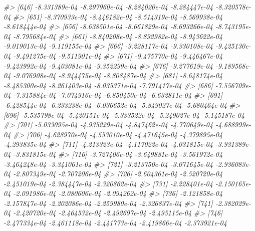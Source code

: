 \documentclass[
]{article}
\newenvironment{Shaded}{\begin{snugshade}}{\end{snugshade}}
\newcommand{\CommentTok}[1]{\textcolor[rgb]{0.56,0.35,0.01}{\textit{#1}}}
\begin{document}
\begin{Shaded}
\begin{Highlighting}[]
\CommentTok{\#\textgreater{} [646] {-}8.331389e{-}04 {-}8.297960e{-}04 {-}8.284020e{-}04 {-}8.284447e{-}04 {-}8.320578e{-}04}
\CommentTok{\#\textgreater{} [651] {-}8.370933e{-}04 {-}8.446182e{-}04 {-}8.514319e{-}04 {-}8.569938e{-}04 {-}8.618444e{-}04}
\CommentTok{\#\textgreater{} [656] {-}8.638501e{-}04 {-}8.661829e{-}04 {-}8.693266e{-}04 {-}8.743195e{-}04 {-}8.795684e{-}04}
\CommentTok{\#\textgreater{} [661] {-}8.840208e{-}04 {-}8.892982e{-}04 {-}8.943622e{-}04 {-}9.019013e{-}04 {-}9.119155e{-}04}
\CommentTok{\#\textgreater{} [666] {-}9.228117e{-}04 {-}9.330108e{-}04 {-}9.425130e{-}04 {-}9.491275e{-}04 {-}9.511901e{-}04}
\CommentTok{\#\textgreater{} [671] {-}9.475770e{-}04 {-}9.446467e{-}04 {-}9.423992e{-}04 {-}9.403081e{-}04 {-}9.352299e{-}04}
\CommentTok{\#\textgreater{} [676] {-}9.277619e{-}04 {-}9.189568e{-}04 {-}9.076908e{-}04 {-}8.944475e{-}04 {-}8.808487e{-}04}
\CommentTok{\#\textgreater{} [681] {-}8.648174e{-}04 {-}8.485300e{-}04 {-}8.261403e{-}04 {-}8.035371e{-}04 {-}7.791417e{-}04}
\CommentTok{\#\textgreater{} [686] {-}7.556709e{-}04 {-}7.315884e{-}04 {-}7.074916e{-}04 {-}6.850450e{-}04 {-}6.632811e{-}04}
\CommentTok{\#\textgreater{} [691] {-}6.428544e{-}04 {-}6.233238e{-}04 {-}6.036652e{-}04 {-}5.849027e{-}04 {-}5.680464e{-}04}
\CommentTok{\#\textgreater{} [696] {-}5.535798e{-}04 {-}5.420151e{-}04 {-}5.333522e{-}04 {-}5.249027e{-}04 {-}5.145187e{-}04}
\CommentTok{\#\textgreater{} [701] {-}5.033095e{-}04 {-}4.935229e{-}04 {-}4.847462e{-}04 {-}4.770649e{-}04 {-}4.688999e{-}04}
\CommentTok{\#\textgreater{} [706] {-}4.628970e{-}04 {-}4.553010e{-}04 {-}4.471645e{-}04 {-}4.379895e{-}04 {-}4.293835e{-}04}
\CommentTok{\#\textgreater{} [711] {-}4.213323e{-}04 {-}4.117022e{-}04 {-}4.031815e{-}04 {-}3.931389e{-}04 {-}3.831815e{-}04}
\CommentTok{\#\textgreater{} [716] {-}3.727406e{-}04 {-}3.649881e{-}04 {-}3.561972e{-}04 {-}3.464248e{-}04 {-}3.341061e{-}04}
\CommentTok{\#\textgreater{} [721] {-}3.213750e{-}04 {-}3.071645e{-}04 {-}2.936083e{-}04 {-}2.807349e{-}04 {-}2.707206e{-}04}
\CommentTok{\#\textgreater{} [726] {-}2.604361e{-}04 {-}2.520720e{-}04 {-}2.451019e{-}04 {-}2.384447e{-}04 {-}2.320862e{-}04}
\CommentTok{\#\textgreater{} [731] {-}2.228401e{-}04 {-}2.150165e{-}04 {-}2.091986e{-}04 {-}2.080606e{-}04 {-}2.094262e{-}04}
\CommentTok{\#\textgreater{} [736] {-}2.121858e{-}04 {-}2.157847e{-}04 {-}2.202086e{-}04 {-}2.259980e{-}04 {-}2.326837e{-}04}
\CommentTok{\#\textgreater{} [741] {-}2.382029e{-}04 {-}2.420720e{-}04 {-}2.464532e{-}04 {-}2.492697e{-}04 {-}2.495115e{-}04}
\CommentTok{\#\textgreater{} [746] {-}2.477334e{-}04 {-}2.461118e{-}04 {-}2.441773e{-}04 {-}2.419866e{-}04 {-}2.373921e{-}04}

\end{Highlighting}
\end{Shaded}
\end{document}
